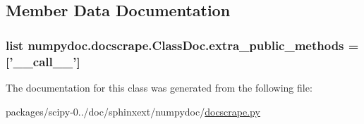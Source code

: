 \subsection{Member Data Documentation}
\hypertarget{classnumpydoc_1_1docscrape_1_1ClassDoc_a7e8956388fa62f62c9c78dbdd6757825}{}
\subsubsection[{extra\+\_\+public\+\_\+methods}]{\setlength{\rightskip}{0pt plus 5cm}list numpydoc.\+docscrape.\+Class\+Doc.\+extra\+\_\+public\+\_\+methods = \mbox{[}'\+\_\+\+\_\+call\+\_\+\+\_\+'\mbox{]}\hspace{0.3cm}{\ttfamily [static]}}\label{classnumpydoc_1_1docscrape_1_1ClassDoc_a7e8956388fa62f62c9c78dbdd6757825}


The documentation for this class was generated from the following file\+:\begin{DoxyCompactItemize}
\item 
packages/scipy-\/0../doc/sphinxext/numpydoc/\hyperlink{docscrape_8py}{docscrape.\+py}\end{DoxyCompactItemize}
